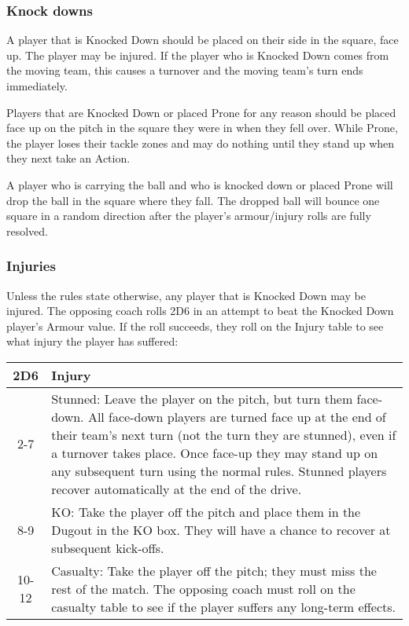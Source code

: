\begin{multicols}{2}
\subsubsection{Knock downs}
\par A player that is Knocked Down should be placed on their side in the square, face up. The player may be injured. If the player who is Knocked Down comes from the moving team, this causes a turnover and the moving team's turn ends immediately.
\par Players that are Knocked Down or placed Prone for any reason should be placed face up on the pitch in the square they were in when they fell over. While Prone, the player loses their tackle zones and may do nothing until they stand up when they next take an Action.
\par A player who is carrying the ball and who is knocked down or placed Prone will drop the ball in the square where they fall. The dropped ball will bounce one square in a random direction after the player's armour/injury rolls are fully resolved.

\subsubsection{Injuries}
\par Unless the rules state otherwise, any player that is Knocked Down may be injured. The opposing coach rolls 2D6 in an attempt to beat the Knocked Down player's Armour value. If the roll succeeds, they roll on the Injury table to see what injury the player has suffered:

\medskip
\begin{tabularx}{\linewidth}{ | c | X | }
\hline
\textbf{2D6} & \textbf{Injury} \\
\hline
2-7 & Stunned: Leave the player on the pitch, but turn them face-down. All face-down players are turned face up at the end of their team's next turn (not the turn they are stunned), even if a turnover takes place. Once face-up they may stand up on any subsequent turn using the normal rules. Stunned players recover automatically at the end of the drive. \\
\hline
8-9 & KO: Take the player off the pitch and place them in the Dugout in the KO box. They will have a chance to recover at subsequent kick-offs. \\
\hline
10-12 & Casualty: Take the player off the pitch; they must miss the rest of the match. The opposing coach must roll on the casualty table to see if the player suffers any long-term effects. \\
\hline
\end{tabularx}
\medskip


\end{multicols}
